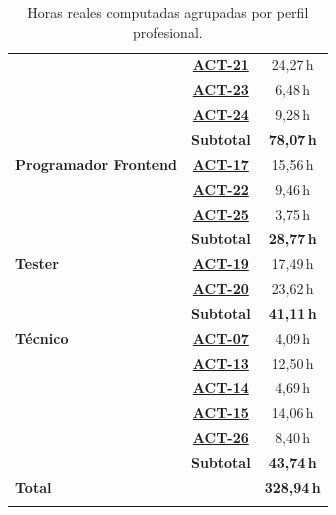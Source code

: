 \begin{appendices}
\begin{table}[H]
{\begin{tabularx}{0.75\textwidth}{Ycc}
        & \hyperref[act:21]{\textbf{ACT-21}} & 24,27\,h \\
        & \hyperref[act:23]{\textbf{ACT-23}} & 6,48\,h \\
        & \hyperref[act:24]{\textbf{ACT-24}} & 9,28\,h \\
        & \textbf{Subtotal} & \textbf{78,07\,h} \\
      \hline
      \textbf{Programador Frontend} 
        & \hyperref[act:17]{\textbf{ACT-17}} & 15,56\,h \\
        & \hyperref[act:22]{\textbf{ACT-22}} & 9,46\,h \\
        & \hyperref[act:25]{\textbf{ACT-25}} & 3,75\,h \\
        & \textbf{Subtotal} & \textbf{28,77\,h} \\
      \hline
      \textbf{Tester} 
        & \hyperref[act:19]{\textbf{ACT-19}} & 17,49\,h \\
        & \hyperref[act:20]{\textbf{ACT-20}} & 23,62\,h \\
        & \textbf{Subtotal} & \textbf{41,11\,h} \\
      \hline
      \textbf{Técnico} 
        & \hyperref[act:07]{\textbf{ACT-07}} & 4,09\,h \\
        & \hyperref[act:13]{\textbf{ACT-13}} & 12,50\,h \\
        & \hyperref[act:14]{\textbf{ACT-14}} & 4,69\,h \\
        & \hyperref[act:15]{\textbf{ACT-15}} & 14,06\,h \\
        & \hyperref[act:26]{\textbf{ACT-26}} & 8,40\,h \\
        & \textbf{Subtotal} & \textbf{43,74\,h} \\
      \bighline
      \textbf{Total} & & \textbf{328,94\,h} \\
      \bighline
    \end{tabularx}%
  }
  \caption{Horas reales computadas agrupadas por perfil profesional.}
  \label{tab:horas_personal_rol}
\end{table}

\end{appendices}